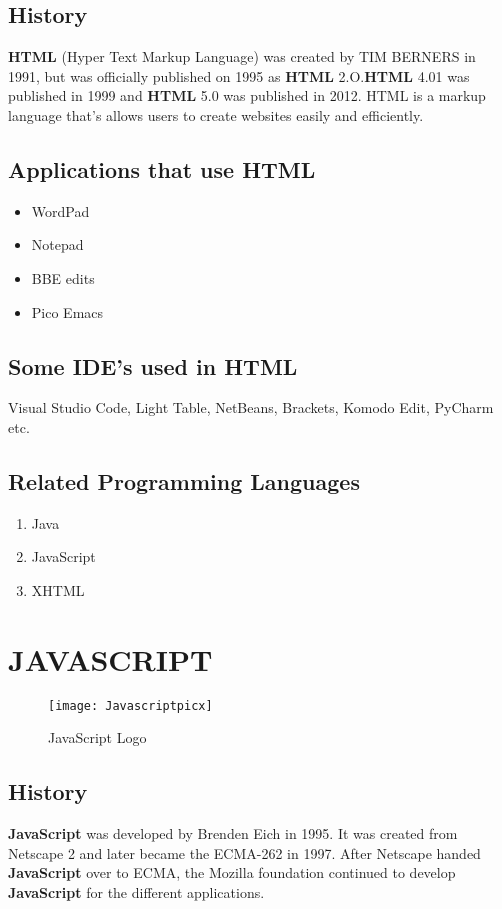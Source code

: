 \documentclass{article}
\begin{document}
            \subsection{History}
               \textbf{HTML} (Hyper Text Markup Language) was created by TIM BERNERS in 1991, but was officially published on 1995 as \textbf{HTML} 2.O.\textbf{HTML} 4.01 was published in 1999 and \textbf{HTML} 5.0 was published in 2012. HTML is a markup language that’s allows users to create websites easily and efficiently.
             \subsection{Applications that use HTML}
             \begin{itemize}
             	\item WordPad
             	\item Notepad
             	\item BBE edits
             	\item Pico Emacs
             \end{itemize}  
               \subsection{Some IDE's used in HTML}
                   Visual Studio Code, Light Table, NetBeans, Brackets, Komodo Edit, PyCharm etc.
                \subsection{Related Programming Languages}
                \begin{enumerate}
                	\item Java
                	\item JavaScript
                	\item XHTML
                \end{enumerate}   
            \pagebreak
         \section{JAVASCRIPT}
\begin{figure}[t]
	\centering
	\texttt{[image: Javascriptpicx]}
	\caption{JavaScript Logo}
	\label{Javascrpit logo}
\end{figure}
         \subsection{History}
         \textbf{JavaScript} was developed by Brenden Eich in 1995. It was created from Netscape 2 and later became the ECMA-262 in 1997. After Netscape handed \textbf{JavaScript} over to ECMA, the Mozilla foundation continued to develop \textbf{JavaScript} for the different applications.
\end{document}
